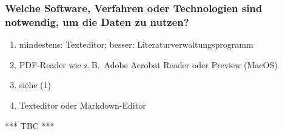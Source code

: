 \subsubsection{Welche Software, Verfahren oder Technologien sind notwendig, um die Daten zu nutzen?}

\begin{enumerate}[(1)]
  \item
    mindestens: Texteditor; besser: Literaturverwaltungsprogramm
  \item
    PDF-Reader wie z.\,B.\ Adobe Acrobat Reader oder Preview (MacOS)
  \item
    siehe (1)
  \item
    Texteditor oder Markdown-Editor
\end{enumerate}


*** TBC ***


